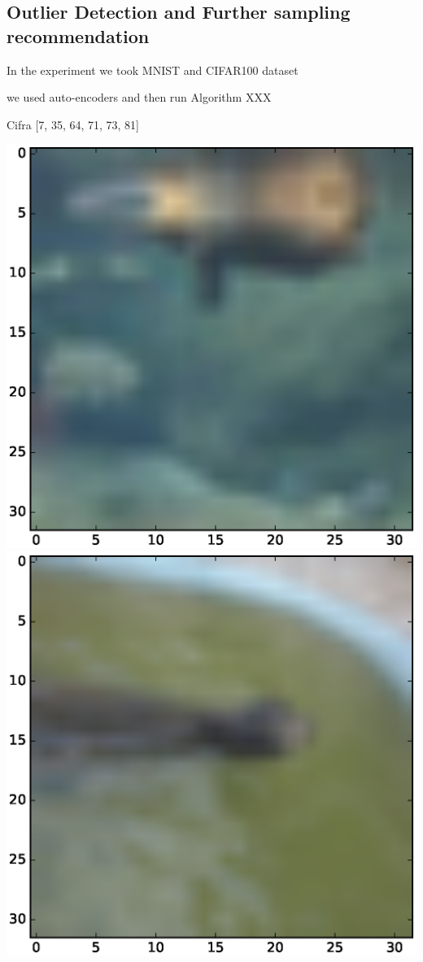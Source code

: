 \documentclass{article}
\begin{document}
\subsection{Outlier Detection and Further sampling recommendation}

In the experiment we took MNIST and CIFAR100 dataset

we used  auto-encoders and then run Algorithm XXX





Cifra 
[7, 35, 64, 71, 73, 81]

\includegraphics[scale=.1]{fig/c5.eps}
\includegraphics[scale=.1]{fig/c6.eps}
\end{document}
